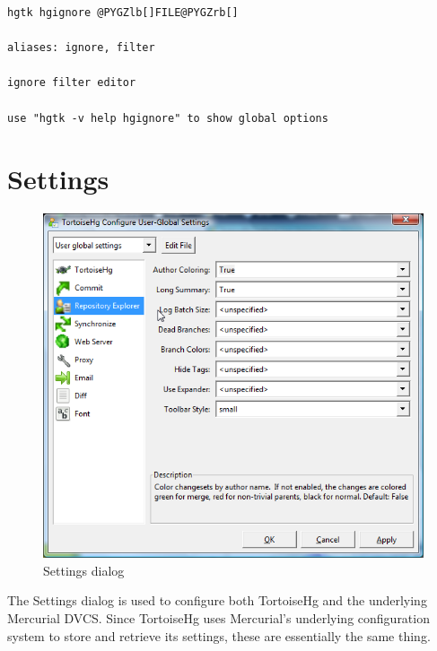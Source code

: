 \documentclass[letterpaper,10pt,english]{manual}
\begin{document}
\begin{Verbatim}[commandchars=@\[\]]
hgtk hgignore @PYGZlb[]FILE@PYGZrb[]

aliases: ignore, filter

ignore filter editor

use "hgtk -v help hgignore" to show global options
\end{Verbatim}

\resetcurrentobjects
\hypertarget{--doc-settings}{}

\chapter{Settings}
\hypertarget{module-settings.dialog}{}
\begin{figure}[htbp]
\centering

\includegraphics{settings.png}
\caption{Settings dialog}\end{figure}

The Settings dialog is used to configure both TortoiseHg and the
underlying Mercurial DVCS.  Since TortoiseHg uses Mercurial's underlying
configuration system to store and retrieve its settings, these are
essentially the same thing.
\end{document}
